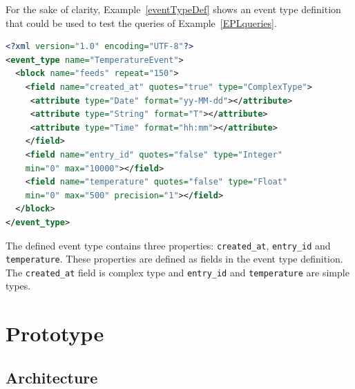 \documentclass[review]{elsarticle}
\begin{document}
For the sake of clarity, Example~\ref{eventTypeDef} shows an event type
definition that could be used to test the queries of Example~\ref{EPLqueries}.

\begin{lstlisting}[basicstyle=\ttfamily\footnotesize,language=XML,caption=Event type definition example,label=eventTypeDef]
<?xml version="1.0" encoding="UTF-8"?>
<event_type name="TemperatureEvent">
  <block name="feeds" repeat="150">
    <field name="created_at" quotes="true" type="ComplexType">
     <attribute type="Date" format="yy-MM-dd"></attribute>
     <attribute type="String" format="T"></attribute>
     <attribute type="Time" format="hh:mm"></attribute>
    </field>
    <field name="entry_id" quotes="false" type="Integer" 
    min="0" max="10000"></field>
    <field name="temperature" quotes="false" type="Float" 
    min="0" max="500" precision="1"></field>
  </block>
</event_type>
\end{lstlisting}

The defined event type contains three properties: \texttt{created\_at},
\texttt{entry\_id} and \texttt{temperature}. These properties are defined as
fields in the event type definition. The \texttt{created\_at} field is complex
type and \texttt{entry\_id} and \texttt{temperature} are simple types. 


\section{Prototype}
\label{sec:basicprototype}

\subsection{Architecture}
\label{sub:basicprototypearchitecture}
\end{document}
